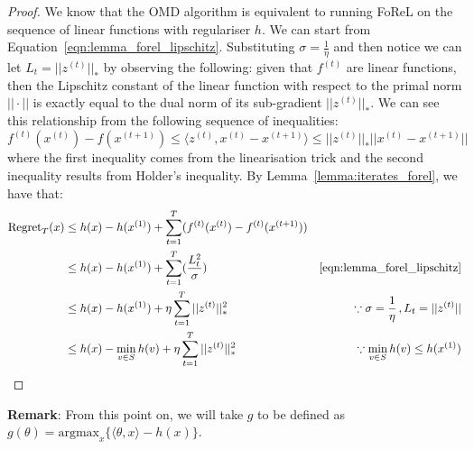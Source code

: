 \begin{proof}
    We know that the OMD algorithm is equivalent to running FoReL on the sequence of linear functions with regulariser $h$. We can start from Equation~\ref{eqn:lemma_forel_lipschitz}. Substituting $\sigma = \frac{1}{\eta}$ and then notice we can let $L_t = ||z^{(t)}||_*$ by observing the following: given that $f^{(t)}$ are linear functions, then the Lipschitz constant of the linear function with respect to the primal norm $||\cdot||$ is exactly equal to the dual norm of its sub-gradient $||z^{(t)}||_*$. We can see this relationship from the following sequence of inequalities: $f^{(t)}(x^{(t)}) - f(x^{(t+1)}) \leq \langle z^{(t)}, x^{(t)} - x^{(t+1)}\rangle\leq ||z^{(t)}||_* ||x^{(t)} - x^{(t+1)}||$ where the first inequality comes from the linearisation trick and the second inequality results from Holder's inequality. By Lemma~\ref{lemma:iterates_forel}, we have that:
    \begin{align*}
        \text{Regret}_T(x) &\leq h(x) - h(x^{(1)}) + \sum_{t=1}^T (f^{(t)}(x^{(t)}) - f^{(t)}(x^{(t+1)}))\\
        &\leq h(x) - h(x^{(1)}) + \sum_{t=1}^T (\frac{L_t^2}{\sigma})&\Cref{eqn:lemma_forel_lipschitz}\\
        &\leq h(x) - h(x^{(1)}) + \eta \sum_{t=1}^T ||z^{(t)}||_*^2 &\because \sigma = \frac{1}{\eta}\,,L_t = ||z^{(t)}||\\
        &\leq h(x) - \min_{v\in S}h(v) + \eta \sum_{t=1}^T ||z^{(t)}||_*^2&\because \min_{v \in S} h(v) \leq h(x^{(1)})
    \end{align*}
\end{proof}

\noindent \textbf{Remark}: From this point on, we will take $g$ to be defined as $g(\theta) = \text{argmax}_x \{ \langle \theta, x \rangle - h(x)\}$.

